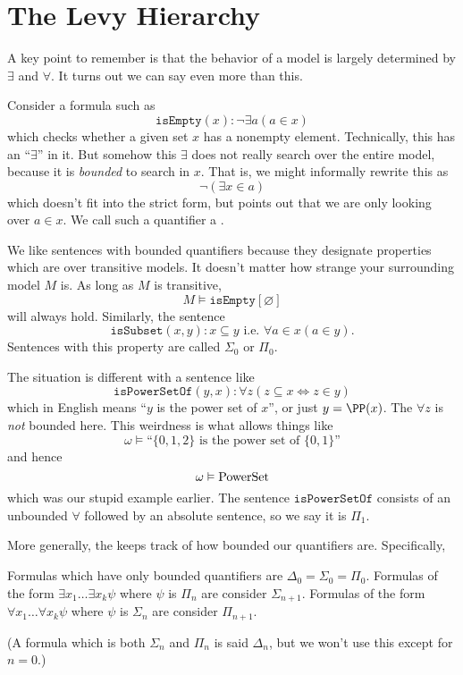 \section{The Levy Hierarchy}
A key point to remember is that the behavior of a model is largely determined by $\exists$ and $\forall$.
It turns out we can say even more than this.

Consider a formula such as
\[ \mathtt{isEmpty}(x) : \neg \exists a (a \in x) \]
which checks whether a given set $x$ has a nonempty element.
Technically, this has an ``$\exists$'' in it.
But somehow this $\exists$ does not really search over the entire model,
because it is \emph{bounded} to search in $x$.
That is, we might informally rewrite this as
\[ \neg (\exists x \in a) \]
which doesn't fit into the strict form,
but points out that we are only looking over $a \in x$.
We call such a quantifier a .

We like sentences with bounded quantifiers because they designate
properties which are  over transitive models.
It doesn't matter how strange your surrounding model $M$ is.
As long as $M$ is transitive, 
\[ M \vDash \mathtt{isEmpty}[\varnothing] \]
will always hold.
Similarly, the sentence
\[ \mathtt{isSubset}(x,y) : x \subseteq y \text { i.e. } \forall a \in x (a \in y). \]
Sentences with this property are called $\Sigma_0$ or $\Pi_0$.

The situation is different with a sentence like
\[
	\mathtt{isPowerSetOf}(y,x) :
	\forall z \left( z \subseteq x \iff z \in y  \right)
\]
which in English means ``$y$ is the power set of $x$'', or just $y = \PP(x)$.
The $\forall z$ is \emph{not} bounded here.
This weirdness is what allows things like
\[ \omega \vDash \text{``$\{0,1,2\}$ is the power set of $\{0,1\}$''} \]
and hence
\[ \omega \vDash \mathrm{PowerSet} \]
which was our stupid example earlier.
The sentence $\mathtt{isPowerSetOf}$ consists of an unbounded $\forall$ followed
by an absolute sentence, so we say it is $\Pi_1$.

More generally, the  keeps track of how bounded our
quantifiers are.
Specifically,
\begin{itemize}
	\ii Formulas which have only bounded quantifiers are $\Delta_0 = \Sigma_0 = \Pi_0$.
	\ii Formulas of the form $\exists x_1 \dots \exists x_k \psi$ where $\psi$ is $\Pi_n$
	are consider $\Sigma_{n+1}$.
	\ii Formulas of the form $\forall x_1 \dots \forall x_k \psi$ where $\psi$ is $\Sigma_n$
	are consider $\Pi_{n+1}$.
\end{itemize}
(A formula which is both $\Sigma_n$ and $\Pi_n$ is said $\Delta_n$, but we won't
use this except for $n=0$.)

